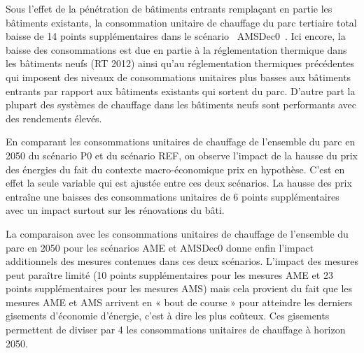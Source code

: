 \documentclass[10.5pt,a4paper]{article}
\begin{document}
{Sous l'effet de la pénétration de bâtiments entrants remplaçant en partie les bâtiments existants, la consommation unitaire de chauffage du parc tertiaire total baisse de 14 points supplémentaires dans le scénario \og~AMSDec0~\fg. Ici encore, la baisse des consommations est due en partie à la réglementation thermique dans les bâtiments neufs (RT 2012) ainsi qu'au réglementation thermiques précédentes qui imposent des niveaux de consommations unitaires plus basses aux bâtiments entrants par rapport aux bâtiments existants qui sortent du parc. D'autre part la plupart des systèmes de chauffage dans les bâtiments neufs sont performants avec des rendements élevés.   

En comparant les consommations unitaires de chauffage de l'ensemble du parc en 2050 du scénario P0 et du scénario REF, on observe l'impact de la hausse du prix des énergies du fait du contexte macro-économique prix en hypothèse. C'est en effet la seule variable qui est ajustée entre ces deux scénarios. La hausse des prix entraîne une baisses des consommations unitaires de 6 points supplémentaires avec un impact surtout sur les rénovations du bâti.  

La comparaison avec les consommations unitaires de chauffage de l'ensemble du parc en 2050 pour les scénarios AME et AMSDec0 donne enfin l'impact additionnels des mesures contenues dans ces deux scénarios. L'impact des mesures peut paraître limité (10 points supplémentaires pour les mesures AME et 23 points supplémentaires pour les mesures AMS) mais cela provient du fait que les mesures AME et AMS arrivent en « bout de course » pour atteindre les derniers gisements d’économie d’énergie, c'est à dire les plus coûteux. Ces gisements permettent de diviser par 4 les consommations unitaires de chauffage à horizon 2050. 

}
\end{document}
